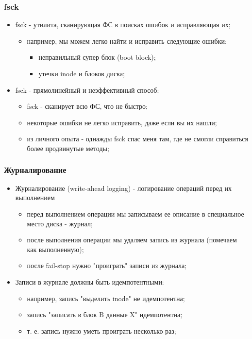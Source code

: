 \begin{frame}
\frametitle{fsck}
\begin{itemize}
  \item<1-> fsck - утилита, сканирующая ФС в поисках ошибок и исправляющая их;
    \begin{itemize}
      \item например, мы можем легко найти и исправить следующие ошибки:
         \begin{itemize}
           \item неправильный супер блок (boot block);
           \item утечки inode и блоков диска;
         \end{itemize}
    \end{itemize}
  \item<2-> fsck - прямолинейный и неэффективный способ:
    \begin{itemize}
      \item fsck - сканирует всю ФС, что не быстро;
      \item некоторые ошибки не легко исправить, даже если вы их нашли;
      \item из личного опыта - однажды fsck спас меня там, где не смогли справиться более продвинутые методы;
    \end{itemize}
\end{itemize}
\end{frame}

\begin{frame}
\frametitle{Журналирование}
\begin{itemize}
  \item<1-> Журналирование (write-ahead logging) - логирование операций перед их выполнением
    \begin{itemize}
      \item перед выполнением операции мы записываем ее описание в специальное место диска - журнал;
      \item после выполнения операции мы удаляем запись из журнала (помечаем как выполненную);
      \item после fail-stop нужно "проиграть" записи из журнала;
    \end{itemize}
  \item<2-> Записи в журнале должны быть идемпотентными:
    \begin{itemize}
      \item например, запись "выделить inode" не идемпотентна;
      \item запись "записать в блок B данные X" идемпотентна;
      \item т. е. запись нужно уметь проиграть несколько раз;
    \end{itemize}
\end{itemize}
\end{frame}

